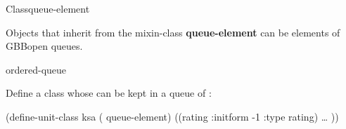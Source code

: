 \documentclass[10pt,twoside,english,pdftex]{article}
\begin{document}

\begin{functiondoc}{Class}{queue-element}{}
%
  
\fnsyntax

\fnpackage {}

\fnmodule {}

\fndescription Objects that inherit from the mixin-class
\textbf{queue-element} can be elements of GBBopen queues.

\begin{alsos}{ordered-queue}
\also[on-queue-p]
\also[queue]
\end{alsos}

\fnexample 
{}%
Define a  class whose  can be kept
in a queue of :
\begin{example}
  (define-unit-class ksa ( queue-element)
    ((rating
      :initform -1
      :type rating)
      \textrm{\ldots{}} ))
\end{example}

\end{functiondoc}

\end{document}
